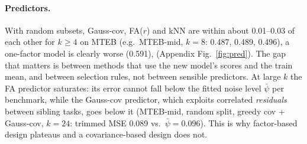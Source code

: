 \documentclass{article}
\begin{document}
\paragraph{Predictors.} With random subsets, Gauss-cov, FA($r$) and kNN are within about 0.01--0.03 of each other for $k\ge4$ on MTEB (e.g.\ MTEB-mid, $k=8$: 0.487, 0.489, 0.496), a one-factor model is clearly worse (0.591), (Appendix Fig.~\ref{fig:pred}). The gap that matters is between methods that use the new model's scores and the train mean, and between selection rules, not between sensible predictors. At large $k$ the FA predictor saturates: its error cannot fall below the fitted noise level $\bar\psi$ per benchmark, while the Gauss-cov predictor, which exploits correlated \emph{residuals} between sibling tasks, goes below it (MTEB-mid, random split, greedy cov + Gauss-cov, $k=24$: trimmed MSE 0.089 vs.\ $\bar\psi=0.096$). This is why factor-based design plateaus and a covariance-based design does not.
\end{document}
